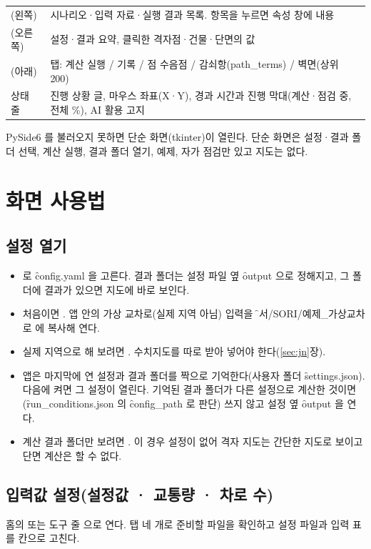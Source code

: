 \documentclass[10.5pt,a4paper]{article}
\begin{document}
\begin{table}[h]
\begin{tabularx}{\textwidth}{P{30mm}L}
(왼쪽) & 시나리오·입력 자료·실행 결과 목록. 항목을 누르면 속성 창에 내용 \\
(오른쪽) & 설정·결과 요약, 클릭한 격자점·건물·단면의 값 \\
(아래) & 탭: 계산 실행 / 기록 / 점 수음점 / 감쇠항(path\_terms) / 벽면(상위 200) \\
상태 줄 & 진행 상황 글, 마우스 좌표(X·Y), 경과 시간과 진행 막대(계산·점검 중, 전체 \%), AI 활용 고지 \\
\bottomrule
\end{tabularx}
\end{table}

PySide6 를 불러오지 못하면 단순 화면(tkinter)이 열린다. 단순 화면은 설정·결과 폴더 선택, 계산 실행, 결과 폴더 열기, 예제, 자가 점검만 있고 지도는 없다.

\section{화면 사용법}

\subsection{설정 열기}
\begin{itemize}
\item {}\menu{}로 \f{config.yaml} 을 고른다. 결과 폴더는 설정 파일 옆 \f{output} 으로 정해지고, 그 폴더에 결과가 있으면 지도에 바로 보인다.
\item 처음이면 \menu{}. 앱 안의 가상 교차로(실제 지역 아님) 입력을 \f{문서/SORI/예제\_가상교차로} 에 복사해 연다.
\item 실제 지역으로 해 보려면 \menu{}. 수치지도를 따로 받아 넣어야 한다(\ref{sec:jn}장).
\item 앱은 마지막에 연 설정과 결과 폴더를 짝으로 기억한다(사용자 폴더 \f{settings.json}). 다음에 켜면 그 설정이 열린다. 기억된 결과 폴더가 다른 설정으로 계산한 것이면(\f{run\_conditions.json} 의 \f{config\_path} 로 판단) 쓰지 않고 설정 옆 \f{output} 을 연다.
\item 계산 결과 폴더만 보려면 \menu{}. 이 경우 설정이 없어 격자 지도는 간단한 지도로 보이고 단면 계산은 할 수 없다.
\end{itemize}

\subsection{입력값 설정(설정값 · 교통량 · 차로 수)}\label{sec:input}
홈의  또는 도구 줄 으로 연다. 탭 네 개로 준비할 파일을 확인하고 설정 파일과 입력 표를 칸으로 고친다.
\end{document}
